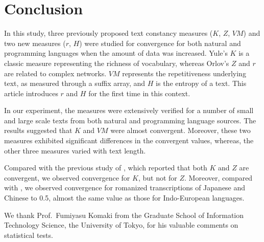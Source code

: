 \documentclass[english]{jnlp_1.4_rep}
\begin{document}
\section{Conclusion}

In this study, three previously proposed text constancy measures ($K$, $Z$, $\mathit{VM}$) and 
two new measures ($r$, $H$) were studied for convergence for both natural and programming languages when the amount of data was increased. Yule's $K$ is a classic measure representing the richness of vocabulary, whereas Orlov's $Z$ and $r$ are related to complex networks. $\mathit{VM}$ represents the repetitiveness underlying text, as measured through a suffix array, and $H$ is the entropy of a text. This article introduces $r$ and $H$ for the first time in this context.

In our experiment, the measures were extensively verified for a number of small and large scale texts from both natural and programming 
language sources. The results suggested that $K$ and $\mathit{VM}$ were almost convergent. 
Moreover, these two measures exhibited significant differences in the convergent values, whereas, the other three measures varied 
with text length.

Compared with the previous study of \cite{BaayenTweedie}, which reported that both $K$ and $Z$ are convergent, we observed 
convergence for $K$, but not for $Z$. Moreover, compared with \cite{Golcher}, we observed convergence for 
romanized transcriptions of Japanese and Chinese to 0.5, almost the same value as those for Indo-European languages.



\acknowledgment
We thank Prof.~Fumiyasu Komaki from the Graduate School of Information Technology 
\linebreak
Science, the University of Tokyo, for his valuable comments on statistical tests.
\end{document}
